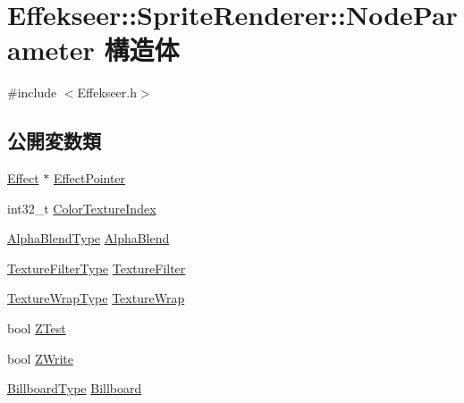 \hypertarget{struct_effekseer_1_1_sprite_renderer_1_1_node_parameter}{}\section{Effekseer\+:\+:Sprite\+Renderer\+:\+:Node\+Parameter 構造体}
\label{struct_effekseer_1_1_sprite_renderer_1_1_node_parameter}


{\ttfamily \#include $<$Effekseer.\+h$>$}

\subsection*{公開変数類}
\begin{DoxyCompactItemize}
\item 
\mbox{\hyperlink{class_effekseer_1_1_effect}{Effect}} $\ast$ \mbox{\hyperlink{struct_effekseer_1_1_sprite_renderer_1_1_node_parameter_ae7a9251a7888b0a1e42271a6bbfc9729}{Effect\+Pointer}}
\item 
int32\+\_\+t \mbox{\hyperlink{struct_effekseer_1_1_sprite_renderer_1_1_node_parameter_a73ccb925cd40ba3d09365e92b28a46e9}{Color\+Texture\+Index}}
\item 
\mbox{\hyperlink{namespace_effekseer_a8c32fd5b7ec7feed73314b2ae8086949}{Alpha\+Blend\+Type}} \mbox{\hyperlink{struct_effekseer_1_1_sprite_renderer_1_1_node_parameter_a1b14867e8d71ab1836d732866df2c973}{Alpha\+Blend}}
\item 
\mbox{\hyperlink{namespace_effekseer_ae3518502cfcb4ec4991f13c0b3e4c6ee}{Texture\+Filter\+Type}} \mbox{\hyperlink{struct_effekseer_1_1_sprite_renderer_1_1_node_parameter_aceda3fc02091f9401fd1cb55596fe7c6}{Texture\+Filter}}
\item 
\mbox{\hyperlink{namespace_effekseer_a5320c83784602974b6278bf1a77b58a3}{Texture\+Wrap\+Type}} \mbox{\hyperlink{struct_effekseer_1_1_sprite_renderer_1_1_node_parameter_a27464e2580b3ba3a78fb6efceb6081fc}{Texture\+Wrap}}
\item 
bool \mbox{\hyperlink{struct_effekseer_1_1_sprite_renderer_1_1_node_parameter_a74aa302d891f7f84cf97ed55754a792b}{Z\+Test}}
\item 
bool \mbox{\hyperlink{struct_effekseer_1_1_sprite_renderer_1_1_node_parameter_abc1cbe53f5f3fd0b6b72470774b47f52}{Z\+Write}}
\item 
\mbox{\hyperlink{namespace_effekseer_a1e51959dc188f6f19acc48c85860c6d8}{Billboard\+Type}} \mbox{\hyperlink{struct_effekseer_1_1_sprite_renderer_1_1_node_parameter_afdff1396f25b0c387eb5a57580364ba0}{Billboard}}

\end{DoxyCompactItemize}

